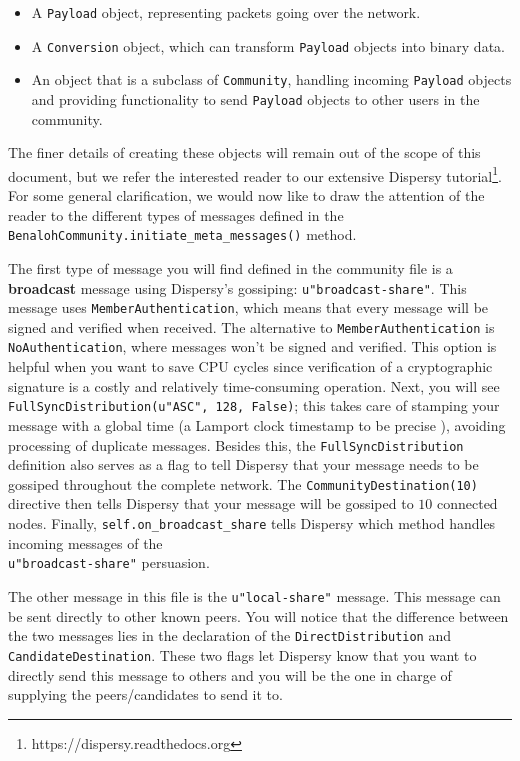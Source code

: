 \documentclass{article}
\begin{document}
\begin{itemize}
\item A \texttt{Payload} object, representing packets going over the network.
\item A \texttt{Conversion} object, which can transform \texttt{Payload} objects into binary data.
\item An object that is a subclass of \texttt{Community}, handling incoming \texttt{Payload} objects and providing functionality to send \texttt{Payload} objects to other users in the community.
\end{itemize}

\noindent The finer details of creating these objects will remain out of the scope of this document, but we refer the interested reader to our extensive Dispersy tutorial\footnote{https://dispersy.readthedocs.org}.
For some general clarification, we would now like to draw the attention of the reader to the different types of messages defined in the \\\texttt{BenalohCommunity.initiate\_meta\_messages()} method.

The first type of message you will find defined in the community file is a \textbf{broadcast} message using Dispersy's gossiping: \texttt{u"broadcast-share"}.
This message uses \texttt{MemberAuthentication}, which means that every message will be signed and verified when received.
The alternative to \texttt{MemberAuthentication} is \texttt{NoAuthentication}, where messages won't be signed and verified.
This option is helpful when you want to save CPU cycles since verification of a cryptographic signature is a costly and relatively time-consuming operation.
Next, you will see \texttt{FullSyncDistribution(u"ASC", 128, False)}; this takes care of stamping your message with a global time (a Lamport clock timestamp to be precise \cite{lamport1978time}), avoiding processing of duplicate messages.
Besides this, the \texttt{FullSyncDistribution} definition also serves as a flag to tell Dispersy that your message needs to be gossiped throughout the complete network.
The \texttt{CommunityDestination(10)} directive then tells Dispersy that your message will be gossiped to $10$ connected nodes.
Finally, \texttt{self.on\_broadcast\_share} tells Dispersy which method handles incoming messages of the \\\texttt{u"broadcast-share"} persuasion.

The other message in this file is the \texttt{u"local-share"} message.
This message can be sent directly to other known peers.
You will notice that the difference between the two messages lies in the declaration of the \texttt{DirectDistribution} and \texttt{CandidateDestination}.
These two flags let Dispersy know that you want to directly send this message to others and you will be the one in charge of supplying the peers/candidates to send it to.
\end{document}
